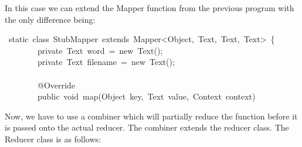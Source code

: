 \documentclass{article}
\begin{document}
In this case we can extend the Mapper function from the previous program with the only difference being:%
\begin{mdpre}%
~{static}~{class}~StubMapper~{extends}~Mapper\textless{}Object,~Text,~Text,~Text\textgreater{}~\{\\
~~~~~~~~{private}~Text~word~=~{new}~Text();\\
~~~~~~~~{private}~Text~filename~=~{new}~Text();\\
\\
~~~~~~~~@Override\\
~~~~~~~~{public}~{void}~map(Object~key,~Text~value,~Context~context)%
\end{mdpre}\noindent Now, we have to use a combiner which will partially reduce the function before it is passed onto the actual reducer. 
The combiner extends the reducer class. The Reducer class is as follows:
\end{document}

